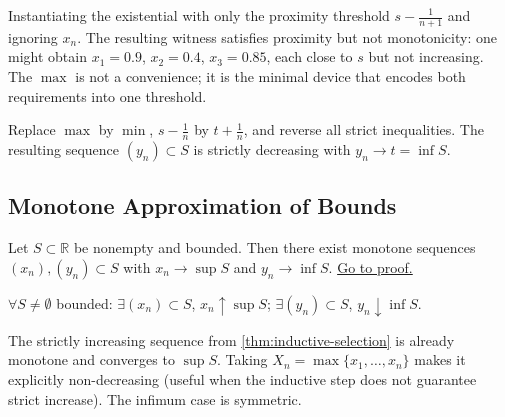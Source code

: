 \begin{remark}
Instantiating the existential with only the proximity threshold
$s-\tfrac{1}{n+1}$ and ignoring $x_n$. The resulting witness satisfies
proximity but not monotonicity: one might obtain $x_1=0.9$, $x_2=0.4$,
$x_3=0.85$, each close to $s$ but not increasing. The $\max$ is not a
convenience; it is the minimal device that encodes both requirements into
one threshold.
\end{remark}

\begin{remark}
Replace $\max$ by $\min$, $s-\tfrac{1}{n}$ by $t+\tfrac{1}{n}$, and
reverse all strict inequalities. The resulting sequence $(y_n)\subset S$
is strictly decreasing with $y_n\to t=\inf S$.
\end{remark}

\subsection*{Monotone Approximation of Bounds}
\label{subsec:monotone-approx}

\begin{proposition}
\label{prop:monotone-approx-bounds}
Let $S\subset\mathbb{R}$ be nonempty and bounded. Then there exist
monotone sequences $(x_n),(y_n)\subset S$ with
$x_n\to\sup S$ and $y_n\to\inf S$.
\hyperref[prf:monotone-approx-bounds]{Go to proof.}
\end{proposition}

\begin{remark*}
\end{remark*}


\begin{remark}
$\forall S\neq\emptyset$ bounded:
$\exists(x_n)\subset S$, $x_n\uparrow\sup S$;\;
$\exists(y_n)\subset S$, $y_n\downarrow\inf S$.
\end{remark}

\begin{remark}
The strictly increasing sequence from \cref{thm:inductive-selection} is
already monotone and converges to $\sup S$. Taking $X_n=\max\{x_1,\ldots,x_n\}$
makes it explicitly non-decreasing (useful when the inductive step does
not guarantee strict increase). The infimum case is symmetric.
\end{remark}


